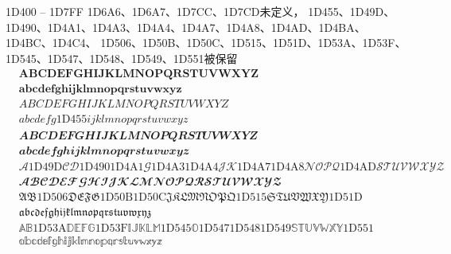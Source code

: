 \documentclass[twoside, 10pt]{article}
\begin{document}
        1D400 -- 1D7FF 1D6A6、1D6A7、1D7CC、1D7CD未定义，
        1D455、1D49D、1D490、1D4A1、1D4A3、1D4A4、1D4A7、1D4A8、1D4AD、1D4BA、1D4BC、1D4C4、
        1D506、1D50B、1D50C、1D515、1D51D、1D53A、1D53F、1D545、1D547、1D548、1D549、1D551被保留
        \begin{align}
            & 𝐀 𝐁 𝐂 𝐃 𝐄 𝐅 𝐆 𝐇 𝐈 𝐉 𝐊 𝐋 𝐌 𝐍 𝐎 𝐏 𝐐 𝐑 𝐒 𝐓 𝐔 𝐕 𝐖 𝐗 𝐘 𝐙 \\
            & 𝐚 𝐛 𝐜 𝐝 𝐞 𝐟 𝐠 𝐡 𝐢 𝐣 𝐤 𝐥 𝐦 𝐧 𝐨 𝐩 𝐪 𝐫 𝐬 𝐭 𝐮 𝐯 𝐰 𝐱 𝐲 𝐳 \\
            & 𝐴 𝐵 𝐶 𝐷 𝐸 𝐹 𝐺 𝐻 𝐼 𝐽 𝐾 𝐿 𝑀 𝑁 𝑂 𝑃 𝑄 𝑅 𝑆 𝑇 𝑈 𝑉 𝑊 𝑋 𝑌 𝑍 \\
            & 𝑎 𝑏 𝑐 𝑑 𝑒 𝑓 𝑔 \text{1D455} 𝑖 𝑗 𝑘 𝑙 𝑚 𝑛 𝑜 𝑝 𝑞 𝑟 𝑠 𝑡 𝑢 𝑣 𝑤 𝑥 𝑦 𝑧 \\
            & 𝑨 𝑩 𝑪 𝑫 𝑬 𝑭 𝑮 𝑯 𝑰 𝑱 𝑲 𝑳 𝑴 𝑵 𝑶 𝑷 𝑸 𝑹 𝑺 𝑻 𝑼 𝑽 𝑾 𝑿 𝒀 𝒁 \\
            & 𝒂 𝒃 𝒄 𝒅 𝒆 𝒇 𝒈 𝒉 𝒊 𝒋 𝒌 𝒍 𝒎 𝒏 𝒐 𝒑 𝒒 𝒓 𝒔 𝒕 𝒖 𝒗 𝒘 𝒙 𝒚 𝒛 \\
            & 𝒜 \text{1D49D} 𝒞 𝒟 \text{1D490} \text{1D4A1} 𝒢 \text{1D4A3} \text{1D4A4} 𝒥 𝒦 \text{1D4A7} \text{1D4A8} 𝒩 𝒪 𝒫 𝒬 \text{1D4AD} 𝒮 𝒯 𝒰 𝒱 𝒲 𝒳 𝒴 𝒵 \\
            & 𝓐 𝓑 𝓒 𝓓 𝓔 𝓕 𝓖 𝓗 𝓘 𝓙 𝓚 𝓛 𝓜 𝓝 𝓞 𝓟 𝓠 𝓡 𝓢 𝓣 𝓤 𝓥 𝓦 𝓧 𝓨 𝓩 \\
            & 𝔄 𝔅 \text{1D506} 𝔇 𝔈 𝔉 𝔊 \text{1D50B} \text{1D50C} 𝔍 𝔎 𝔏 𝔐 𝔑 𝔒 𝔓 𝔔 \text{1D515} 𝔖 𝔗 𝔘 𝔙 𝔚 𝔛 𝔜 \text{1D51D} \\
            & 𝔞 𝔟 𝔠 𝔡 𝔢 𝔣 𝔤 𝔥 𝔦 𝔧 𝔨 𝔩 𝔪 𝔫 𝔬 𝔭 𝔮 𝔯 𝔰 𝔱 𝔲 𝔳 𝔴 𝔵 𝔶 𝔷 \\
            & 𝔸 𝔹 \text{1D53A} 𝔻 𝔼 𝔽 𝔾 \text{1D53F} 𝕀 𝕁 𝕂 𝕃 𝕄 \text{1D545} 𝕆 \text{1D547} \text{1D548} \text{1D549} 𝕊 𝕋 𝕌 𝕍 𝕎 𝕏 𝕐 \text{1D551} \\
            & 𝕒 𝕓 𝕔 𝕕 𝕖 𝕗 𝕘 𝕙 𝕚 𝕛 𝕜 𝕝 𝕞 𝕟 𝕠 𝕡 𝕢 𝕣 𝕤 𝕥 𝕦 𝕧 𝕨 𝕩 𝕪 𝕫 \\
        \end{align}
\end{document}
